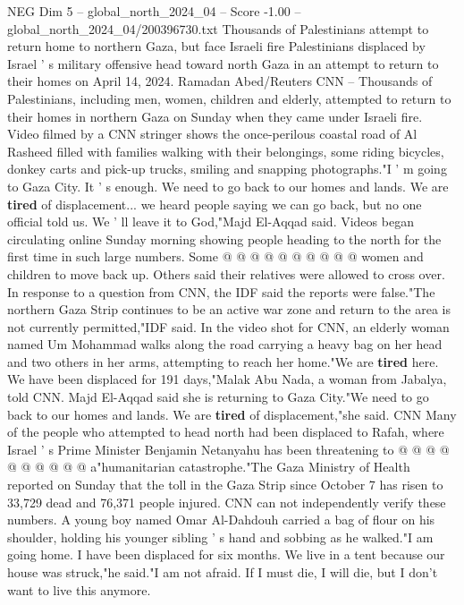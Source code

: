 \begin{textsample}{NEG Dim 5 – global\_north\_2024\_04 – Score -1.00 – global\_north\_2024\_04/200396730.txt}  \label{ex:f5_neg_190}
Thousands of Palestinians attempt to return home to northern Gaza, but face Israeli fire Palestinians displaced by Israel ' s military offensive head toward north Gaza in an attempt to return to their homes on April 14, 2024.
Ramadan Abed/Reuters CNN -- Thousands of Palestinians, including men, women, children and elderly, attempted to return to their homes in northern Gaza on Sunday when they came under Israeli fire.
Video filmed by a CNN stringer shows the once-perilous coastal road of Al Rasheed filled with families walking with their belongings, some riding bicycles, donkey carts and pick-up trucks, smiling and snapping photographs."I ' m going to Gaza City.
It ' s enough.
We need to go back to our homes and lands.
We are \textbf{tired} of displacement... we heard people saying we can go back, but no one official told us.
We ' ll leave it to God,"Majd El-Aqqad said.
Videos began circulating online Sunday morning showing people heading to the north for the first time in such large numbers.
Some @ @ @ @ @ @ @ @ @ @ women and children to move back up.
Others said their relatives were allowed to cross over.
In response to a question from CNN, the IDF said the reports were false."The northern Gaza Strip continues to be an active war zone and return to the area is not currently permitted,"IDF said.
In the video shot for CNN, an elderly woman named Um Mohammad walks along the road carrying a heavy bag on her head and two others in her arms, attempting to reach her home."We are \textbf{tired} here.
We have been displaced for 191 days,"Malak Abu Nada, a woman from Jabalya, told CNN.
Majd El-Aqqad said she is returning to Gaza City."We need to go back to our homes and lands.
We are \textbf{tired} of displacement,"she said.
CNN Many of the people who attempted to head north had been displaced to Rafah, where Israel ' s Prime Minister Benjamin Netanyahu has been threatening to @ @ @ @ @ @ @ @ @ @ a"humanitarian catastrophe."The Gaza Ministry of Health reported on Sunday that the toll in the Gaza Strip since October 7 has risen to 33,729 dead and 76,371 people injured.
CNN can not independently verify these numbers.
A young boy named Omar Al-Dahdouh carried a bag of flour on his shoulder, holding his younger sibling ' s hand and sobbing as he walked."I am going home.
I have been displaced for six months.
We live in a tent because our house was struck,"he said."I am not afraid.
If I must die, I will die, but I don't want to live this anymore.

\end{textsample}
